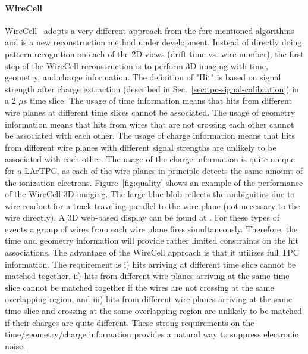 \paragraph{WireCell}
WireCell~\cite{wire-cell} adopts a very different approach from the 
fore-mentioned algorithms and is a new reconstruction method under development.
Instead of directly doing pattern recognition on each of the 2D views (drift 
time vs. wire number), the first step of the WireCell reconstruction is to 
perform 3D imaging with time, geometry, and charge information. The definition
of "Hit" is based on signal strength after charge extraction (described in 
Sec.~\ref{sec:tpc-signal-calibration}) in a 2 $\mu$s time slice. The usage of 
time information means that hits from different wire planes at different time 
slices cannot be associated. The usage of geometry information means that hits
from wires that are not crossing each other cannot be associated with each other. 
The usage of charge information means that hits from different wire planes
with different signal strengths are unlikely to be associated with each other. The 
usage of the charge information is quite unique for a LArTPC, as each of the 
wire planes in principle detects the same amount of the ionization electrons. 
Figure~\ref{fig:quality} shows an example of the performance of the WireCell 3D imaging. 
The large blue blob reflects the ambiguities due to wire readout for a track
traveling parallel to the wire plane (not necessary to the wire directly). A 3D web-based 
display can be found at \cite{ref:wirecell-3D}. 
For these types of events a group of wires from each 
wire plane fires simultaneously. Therefore, the time and geometry 
information will provide rather limited constraints on the hit associations.
The advantage of the WireCell approach is that it utilizes full TPC 
information. The requirement is i) hits arriving at different time slice cannot be
matched together, ii) hits from different wire planes arriving at the same time slice
cannot be matched together if the wires are not crossing at the same overlapping region, 
and iii) hits from different wire planes arriving at the same time slice and crossing
at the same overlapping region are unlikely to be matched if their charges are quite different. 
These strong requirements 
on the time/geometry/charge information provides a natural way to suppress electronic noise.
